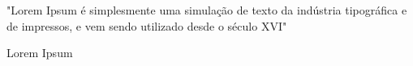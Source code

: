 
\vspace{20cm}

\setlength{\epigraphwidth}{8cm}
\epigraph{"Lorem Ipsum é simplesmente uma simulação de texto da indústria tipográfica e de impressos, e vem sendo utilizado desde o século XVI"}{Lorem Ipsum}
